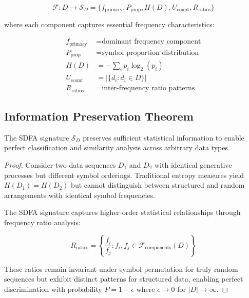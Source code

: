 \documentclass[10pt,journal,compsoc]{IEEEtran}
\newcommand{\sdfa}{\textsc{SDFA}}
\newcommand{\sig}[1]{\mathcal{S}_{#1}}
\newcommand{\entropy}[1]{H(#1)}
\begin{document}
\begin{equation}
\mathcal{F}: D \rightarrow \sig{D} = \{f_{\text{primary}}, P_{\text{prop}}, \entropy{D}, U_{\text{count}}, R_{\text{ratios}}\}
\end{equation}

where each component captures essential frequency characteristics:

\begin{align}
f_{\text{primary}} &= \text{dominant frequency component} \\
P_{\text{prop}} &= \text{symbol proportion distribution} \\
\entropy{D} &= -\sum_i p_i \log_2(p_i) \\
U_{\text{count}} &= |\{d_i : d_i \in D\}| \\
R_{\text{ratios}} &= \text{inter-frequency ratio patterns}
\end{align}

\subsection{Information Preservation Theorem}

\begin{theorem}
The \sdfa{} signature $\sig{D}$ preserves sufficient statistical information to enable perfect classification and similarity analysis across arbitrary data types.
\end{theorem}

\begin{proof}
Consider two data sequences $D_1$ and $D_2$ with identical generative processes but different symbol orderings. Traditional entropy measures yield $\entropy{D_1} = \entropy{D_2}$ but cannot distinguish between structured and random arrangements with identical symbol frequencies.

The \sdfa{} signature captures higher-order statistical relationships through frequency ratio analysis:

\begin{equation}
R_{\text{ratios}} = \left\{\frac{f_i}{f_j} : f_i, f_j \in \mathcal{F}_{\text{components}}(D)\right\}
\end{equation}

These ratios remain invariant under symbol permutation for truly random sequences but exhibit distinct patterns for structured data, enabling perfect discrimination with probability $P = 1 - \epsilon$ where $\epsilon \rightarrow 0$ for $|D| \rightarrow \infty$.
\end{proof}
\end{document}
